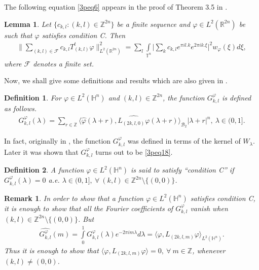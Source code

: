 \documentclass[a4paper,12pt,reqno]{amsart}
\theoremstyle{plain}
\numberwithin{equation}{section}
\newtheorem{lem}{Lemma}[section]
\newtheorem{rem}{Remark}[section]
\newtheorem{defn}{Definition}[section]
\theoremstyle{definition}
\newcounter {own}
\begin{document}
The following equation \eqref{3peq6} appears in the proof of  Theorem 3.5 in \cite{ras}. 
\begin{lem}
Let $\{c_{k,l}:(k,l)\in\mathbb{Z}^{2n}\}$ be a finite sequence and $\varphi\in L^{2}(\mathbb{R}^{2n})$ be such that $\varphi$ satisfies condition C. Then
\begin{eqnarray}
\bigg\|\sum\limits_{(k,l)\in\mathcal{F}}c_{k,l}T_{(k,l)}^{t}\varphi\bigg\|_{L^{2}(\mathbb{R}^{2n})}^{2}=\sum\limits_{l}
\int\limits_{\mathbb {T}^{n}}\bigg|\sum\limits_{k}c_{k,l}e^{\pi il.k}e^{2\pi ik.\xi}\bigg|^{2} w_{\varphi}(\xi)d\xi,\label{3peq6}
\end{eqnarray}
where $\mathcal{F}$ denotes a finite set.
\end{lem}
Now, we shall give some definitions and results which are also given in \cite{ra}.
\begin{defn}
For $\varphi\in L^{2}(\mathbb{H}^{n})$ and $(k,l)\in\mathbb{Z}^{2n}$, the function $G_{k,l}^{\varphi}$ is defined as follows.
\begin{eqnarray}\label{3peq18}
G_{k,l}^{\varphi}(\lambda)=\sum\limits_{r\in\mathbb{Z}}\langle\widehat{\varphi}
(\lambda+r),\widehat{L_{(2k,l,0)}\varphi}(\lambda+r)\rangle_{\mathcal{B}_{2}}
|\lambda+r|^{n},~\lambda\in (0,1].
\end{eqnarray}
\end{defn}
In fact, originally in \cite{ra}, the function $G_{k,l}^{\varphi}$ was defined in terms of the kernel of $W_{\lambda}$. Later it was shown that $G_{k,l}^{\varphi}$ turns out to be \eqref{3peq18}.
\begin{defn}
A function $\varphi\in L^{2}(\mathbb{H}^{n})$ is said to satisfy ``condition C'' if $G_{k,l}^{\varphi}(\lambda)=0$ a.e. $\lambda\in (0,1],~\forall~(k,l)\in\mathbb{Z}^{2n}\setminus\{(0,0)\}$.
\end{defn}
\begin{rem}
In order to show that a function $\varphi\in L^{2}(\mathbb{H}^{n})$ satisfies condition C, it is enough to show that all the Fourier coefficients of $G_{k,l}^{\varphi}$ vanish when $(k,l)\in\mathbb{Z}^{2n}\setminus \{(0,0)\}$.
But
\begin{eqnarray}
\widehat{G_{k,l}^{\varphi}}(m)=\int\limits_{0}^{1} G_{k,l}^{\varphi}(\lambda) e^{-2\pi im\lambda}d\lambda
=\langle\varphi, L_{(2k,l,m)}\varphi\rangle_{L^{2}(\mathbb{H}^{n})}.\label{3pr6}
\end{eqnarray}
Thus it is enough to show that $\langle\varphi, L_{(2k,l,m)}\varphi\rangle=0,~\forall~m\in\mathbb{Z}$, whenever $(k,l)\neq (0,0)$.
\end{rem}
\end{document}
